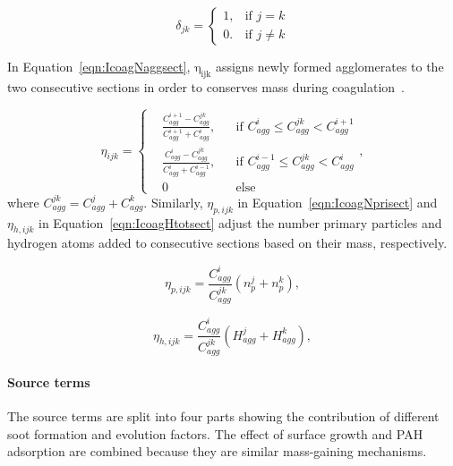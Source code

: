 \begin{equation}
	\delta_{jk}=
	\left\{
	\begin{array}{lr}
		1, & \text{if } j = k\\
		0. & \text{if } j \neq k
	\end{array}
	\right.
	\label{eqn:deltakronecker}
\end{equation}

 In Equation~\eqref{eqn:IcoagNaggsect}, $\mathrm{\eta_{ijk}}$ assigns newly formed agglomerates to the two consecutive sections in order to conserves mass during coagulation~\citep{park2005aerosol}.

\begin{equation}
	\eta_{ijk}=
	\left\{
	\begin{aligned}
	&\frac{C^{i+1}_{agg}-C^{jk}_{agg}}{C^{i+1}_{agg}+C^i_{agg}},
	&&
	\text{if } C^i_{agg} \le C^{jk}_{agg} < C^{i+1}_{agg}
	\\
	&\frac{C^{i}_{agg}-C^{jk}_{agg}}{C^{i}_{agg}+C^{i-1}_{agg}}, 
	&&
	\text{if } C^{i-1}_{agg} \le C^{jk}_{agg} < C^{i}_{agg}
	\\
	&0
	&&\text{else}
	\end{aligned}
	\right.
	\label{eqn:etacoag},
\end{equation}
   \noindent where ${C^{jk}_{agg}=C^{j}_{agg}+C^{k}_{agg}}$. Similarly, $\eta_{p,ijk}$ in Equation~\eqref{eqn:IcoagNprisect} and $\eta_{h,ijk}$ in Equation~\eqref{eqn:IcoagHtotsect} adjust the number primary particles and hydrogen atoms added to consecutive sections based on their mass, respectively.

\begin{equation}
	\eta_{p,ijk}=
	\frac{C^i_{agg}}{C^{jk}_{agg}}
	\left(
		n^j_p + n^k_p
	\right)
	\label{eqn:etapcoag},
\end{equation}

\begin{equation}
	\eta_{h,ijk}=
	\frac{C^i_{agg}}{C^{jk}_{agg}}
	\left(
	H^j_{agg} + H^k_{agg}
	\right)
	\label{eqn:etahcoag},
\end{equation}

\paragraph{Source terms}
The source terms are split into four parts showing the contribution of different soot formation and evolution factors. The effect of surface growth and PAH adsorption are combined because they are similar mass-gaining mechanisms.

